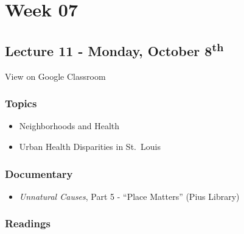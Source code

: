 \documentclass[]{book}
\providecommand{\tightlist}{%
  \setlength{\itemsep}{0pt}\setlength{\parskip}{0pt}}
\theoremstyle{definition}
\theoremstyle{definition}
\theoremstyle{definition}
\theoremstyle{remark}
\begin{document}
\hypertarget{week-07}{%
\section*{Week 07}\label{week-07}}

\hypertarget{lecture-11---monday-october-8th}{%
\subsection*{\texorpdfstring{Lecture 11 - Monday, October
8\textsuperscript{th}}{Lecture 11 - Monday, October 8th}}\label{lecture-11---monday-october-8th}}

View on Google Classroom

\hypertarget{topics-12}{%
\subsubsection*{Topics}\label{topics-12}}

\begin{itemize}
\tightlist
\item
  Neighborhoods and Health
\item
  Urban Health Disparities in St.~Louis
\end{itemize}

\hypertarget{documentary-2}{%
\subsubsection*{Documentary}\label{documentary-2}}

\begin{itemize}
\tightlist
\item
  \emph{Unnatural Causes}, Part 5 - ``Place Matters'' (Pius Library)
\end{itemize}

\hypertarget{readings-11}{%
\subsubsection*{Readings}\label{readings-11}}
\end{document}
